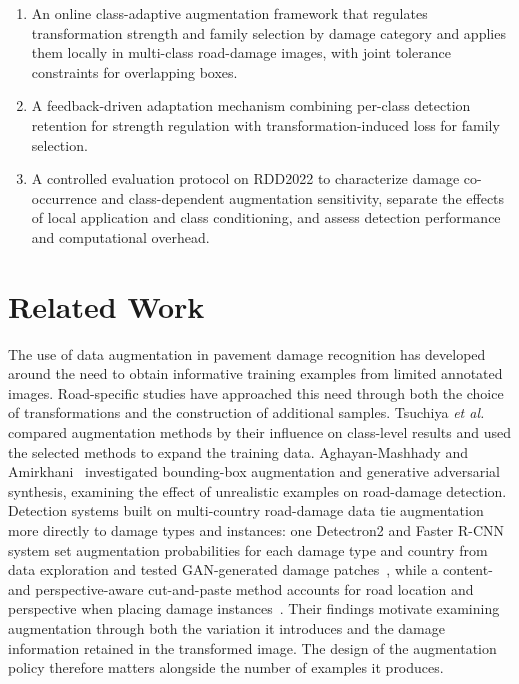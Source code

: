 \documentclass[conference]{IEEEtran}
\begin{document}
\begin{enumerate}
    \item An online class-adaptive augmentation framework that regulates transformation strength and family selection by damage category and applies them locally in multi-class road-damage images, with joint tolerance constraints for overlapping boxes.
    \item A feedback-driven adaptation mechanism combining per-class detection retention for strength regulation with transformation-induced loss for family selection.
    \item A controlled evaluation protocol on RDD2022 to characterize damage co-occurrence and class-dependent augmentation sensitivity, separate the effects of local application and class conditioning, and assess detection performance and computational overhead.
\end{enumerate}

\section{Related Work}
\label{sec:related}

The use of data augmentation in pavement damage recognition has developed around the need to obtain informative training examples from limited annotated images. Road-specific studies have approached this need through both the choice of transformations and the construction of additional samples. Tsuchiya \emph{et al.}~\cite{tsuchiya2019} compared augmentation methods by their influence on class-level results and used the selected methods to expand the training data. Aghayan-Mashhady and Amirkhani~\cite{aghayan2024} investigated bounding-box augmentation and generative adversarial synthesis, examining the effect of unrealistic examples on road-damage detection. Detection systems built on multi-country road-damage data tie augmentation more directly to damage types and instances: one Detectron2 and Faster R-CNN system set augmentation probabilities for each damage type and country from data exploration and tested GAN-generated damage patches~\cite{rdd_detectron2}, while a content- and perspective-aware cut-and-paste method accounts for road location and perspective when placing damage instances~\cite{rdd_cutpaste}. Their findings motivate examining augmentation through both the variation it introduces and the damage information retained in the transformed image. The design of the augmentation policy therefore matters alongside the number of examples it produces.
\end{document}
